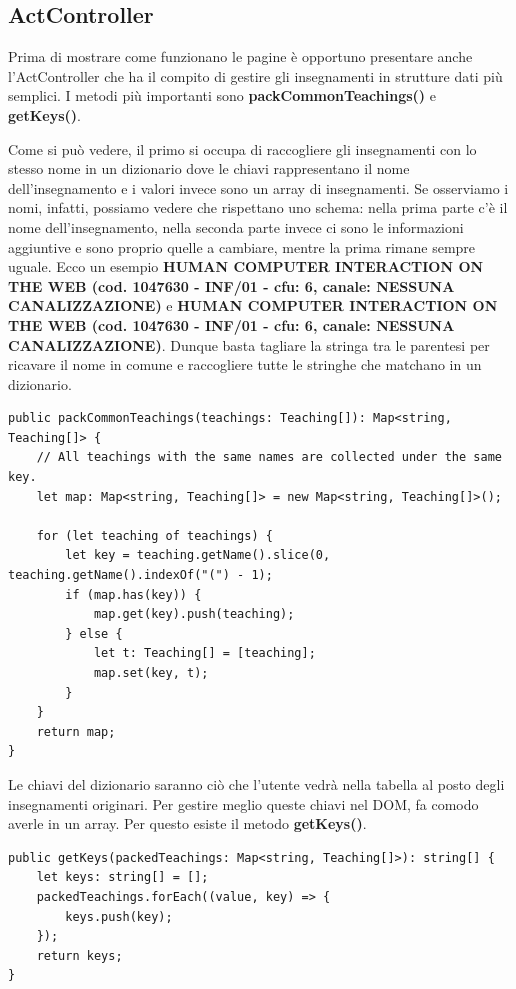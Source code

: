 \documentclass[Lau, oneside, noexaminfo]{sapthesis}%
\begin{document}
\subsection{ActController}
\label{sc:controller}
Prima di mostrare come funzionano le pagine è opportuno presentare anche l'ActController che ha il compito di gestire gli insegnamenti in strutture dati più semplici. I metodi più importanti sono \textbf{packCommonTeachings()} e \textbf{getKeys()}.

Come si può vedere, il primo si occupa di raccogliere gli insegnamenti con lo stesso nome in un dizionario dove le chiavi rappresentano il nome dell'insegnamento e i valori invece sono un array di insegnamenti. Se osserviamo i nomi, infatti, possiamo vedere che rispettano uno schema: nella prima parte c'è il nome dell'insegnamento, nella seconda parte invece ci sono le informazioni aggiuntive e sono proprio quelle a cambiare, mentre la prima rimane sempre uguale. Ecco un esempio \textbf{HUMAN COMPUTER INTERACTION ON THE WEB (cod. 1047630 - INF/01 - cfu: 6, canale: NESSUNA CANALIZZAZIONE)} e \textbf{HUMAN COMPUTER INTERACTION ON THE WEB (cod. 1047630 - INF/01 - cfu: 6, canale: NESSUNA CANALIZZAZIONE)}. Dunque basta tagliare la stringa tra le parentesi per ricavare il nome in comune e raccogliere tutte le stringhe che matchano in un dizionario.
\begin{lstlisting}
public packCommonTeachings(teachings: Teaching[]): Map<string, Teaching[]> {
	// All teachings with the same names are collected under the same key.
	let map: Map<string, Teaching[]> = new Map<string, Teaching[]>();

	for (let teaching of teachings) {
		let key = teaching.getName().slice(0, teaching.getName().indexOf("(") - 1);
		if (map.has(key)) {
			map.get(key).push(teaching);
		} else {
			let t: Teaching[] = [teaching];
			map.set(key, t);
		}
	}
	return map;
}
\end{lstlisting}

Le chiavi del dizionario saranno ciò che l'utente vedrà nella tabella al posto degli insegnamenti originari. Per gestire meglio queste chiavi nel DOM, fa comodo averle in un array. Per questo esiste il metodo \textbf{getKeys()}.

\begin{lstlisting}
public getKeys(packedTeachings: Map<string, Teaching[]>): string[] {
	let keys: string[] = [];
	packedTeachings.forEach((value, key) => {
		keys.push(key);
	});
	return keys;
}
\end{lstlisting}
\end{document}
